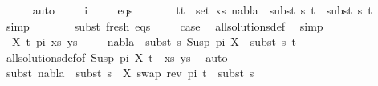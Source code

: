 \begin{isabellebody}
\ \ \ \ \isamarkupfalse%
\ auto\isanewline
\isanewline
\ \ \ \isamarkupfalse%
\ i{\isacharparenleft}{\kern0pt}{}{\isacharparenright}{\kern0pt}\isanewline
\ \ \ \isamarkupfalse%
\ eqs{\isacharcolon}{\kern0pt}\ \ \isanewline
\ \ \ \ {\isachardoublequoteopen}{\isasymforall}\ {\isacharparenleft}{\kern0pt}t{}{\isacharcomma}{\kern0pt}t{}{\isacharparenright}{\kern0pt}\ {\isasymin}\ set\ xs{\isachardot}{\kern0pt}\ nabla{}\ {\isasymturnstile}\ subst\ s{}\ t{}\ {\isasymapprox}\ subst\ s{}\ t{}{\isachardoublequoteclose}\isanewline
\ \ \ \ \ \isamarkupfalse%
\ simp\isanewline
\ \ \isanewline
\ \ \ \isamarkupfalse%
\ subst\ fresh\ eqs\isanewline
\ \ \ \isamarkupfalse%
\ {\isacharquery}{\kern0pt}case\ \isamarkupfalse%
\ all{\isacharunderscore}{\kern0pt}solutions{\isacharunderscore}{\kern0pt}def\ \isamarkupfalse%
\ simp\isanewline
\ \isamarkupfalse%
\isanewline
\ \ \ \isamarkupfalse%
\ {\isacharparenleft}{\kern0pt}{}\ X\ t{\isacharprime}{\kern0pt}\ pi\ xs\ ys{\isacharparenright}{\kern0pt}\isanewline
\ \ \ \isamarkupfalse%
\ {\isachardoublequoteopen}nabla{}\ {\isasymturnstile}\ subst\ s{}\ {\isacharparenleft}{\kern0pt}Susp\ pi\ X{\isacharparenright}{\kern0pt}\ {\isasymapprox}\ subst\ s{}\ t{\isacharprime}{\kern0pt}{\isachardoublequoteclose}\isanewline
\ \ \ \ \ \isamarkupfalse%
\ all{\isacharunderscore}{\kern0pt}solutions{\isacharunderscore}{\kern0pt}def{\isacharbrackleft}{\kern0pt}of\ {\isacartoucheopen}{\isacharparenleft}{\kern0pt}{\isacharparenleft}{\kern0pt}Susp\ pi\ X{\isacharcomma}{\kern0pt}\ t{\isacharprime}{\kern0pt}{\isacharparenright}{\kern0pt}\ {\isacharhash}{\kern0pt}\ xs{\isacharcomma}{\kern0pt}\ ys{\isacharparenright}{\kern0pt}{\isacartoucheclose}{\isacharbrackright}{\kern0pt}\ \isamarkupfalse%
\ auto\isanewline
\ \ \ \isamarkupfalse%
\ subst{\isacharcolon}{\kern0pt}\ {\isachardoublequoteopen}nabla{}\ {\isasymTurnstile}\ subst\ {\isacharparenleft}{\kern0pt}s{}\ {\isasymbullet}\ {\isacharbrackleft}{\kern0pt}{\isacharparenleft}{\kern0pt}X{\isacharcomma}{\kern0pt}\ swap\ {\isacharparenleft}{\kern0pt}rev\ pi{\isacharparenright}{\kern0pt}\ t{\isacharprime}{\kern0pt}{\isacharparenright}{\kern0pt}{\isacharbrackright}{\kern0pt}{\isacharparenright}{\kern0pt}\ {\isasymapprox}\ subst\ s{}{\isachardoublequoteclose}\isanewline

\end{isabellebody}
